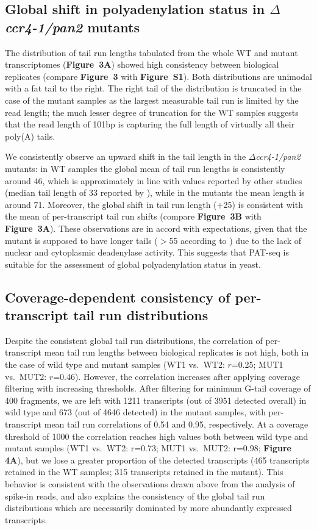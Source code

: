 \documentclass[10pt]{article}
\begin{document}
\subsection*{Global shift in polyadenylation status in \textit{$\Delta$ccr4-1/pan2} mutants}

The distribution of tail run lengths tabulated from the whole WT and mutant transcriptomes (\textbf{Figure~3A}) showed high consistency between biological replicates (compare \textbf{Figure~3} with \textbf{Figure~S1}). Both distributions are unimodal with a fat tail to the right. The right tail of the distribution is truncated in the case of the mutant samples as the largest measurable tail run is limited by the read length; the much lesser degree of truncation for the WT samples suggests that the read length of 101bp is capturing the full length of virtually all their poly(A) tails.

We consistently observe an upward shift in the tail length in the \textit{$\Delta$ccr4-1/pan2} mutants: in WT samples the global mean of tail run lengths is consistently around 46, which is approximately in line with values reported by other studies (median tail length of 33 reported by \cite{subtelny14}), while in the mutants the mean length is around 71. Moreover, the global shift in tail run length (+25) is consistent with the mean of per-transcript tail run shifts (compare \textbf{Figure~3B} with \textbf{Figure~3A}). These observations are in accord with expectations, given that the mutant is supposed to have longer tails ($>$55 according to \cite{beilharz07}) due to the lack of nuclear and cytoplasmic deadenylase activity. This suggests that PAT-seq is suitable for the assessment of global polyadenylation status in yeast.

\subsection*{Coverage-dependent consistency of per-transcript tail run distributions}

Despite the consistent global tail run distributions, the correlation of per-transcript mean tail run lengths between biological replicates is not high, both in the case of wild type and mutant samples (WT1 vs.\ WT2: $r$=0.25; MUT1 vs.\ MUT2: $r$=0.46).
However, the correlation increases after applying coverage filtering with increasing thresholds. After filtering for minimum G-tail coverage of 400 fragments, we are left with 1211 transcripts (out of 3951 detected overall) in wild type and 673 (out of 4646 detected) in the mutant samples, with per-transcript mean tail run correlations of 0.54 and 0.95, respectively.
At a coverage threshold of 1000 the correlation reaches high values both between wild type and mutant samples (WT1 vs.\ WT2: r=0.73; MUT1 vs.\ MUT2: r=0.98; \textbf{Figure 4A}), but we lose a greater proportion of the detected transcripts (465 transcripts retained in the WT samples; 315 transcripts retained in the mutant). 
This behavior is consistent with the observations drawn above from the analysis of spike-in reads, and also explains the consistency of the global tail run distributions which are necessarily dominated by more abundantly expressed transcripts.
\end{document}
